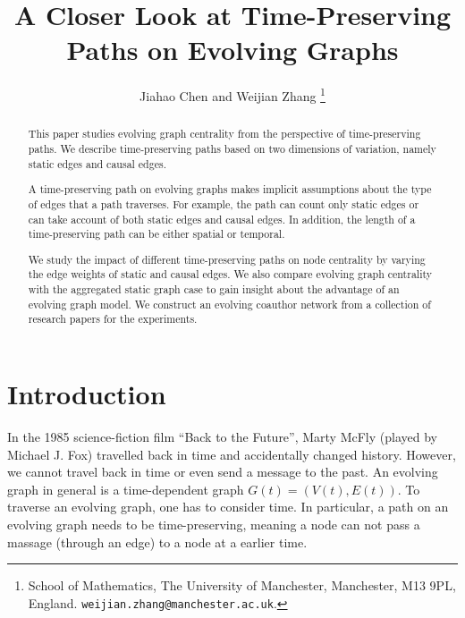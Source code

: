 \documentclass[12pt]{article}
\title{A Closer Look at Time-Preserving Paths on Evolving Graphs}
\author{Jiahao Chen and
Weijian Zhang
\thanks{%
  School of Mathematics,
The University of Manchester,
                Manchester, M13 9PL, England.
\texttt{weijian.zhang@manchester.ac.uk}.
}
}
\theoremstyle{definition}
\begin{document}


\maketitle

\begin{abstract}
This paper studies evolving graph centrality from the perspective of time-preserving paths. We describe time-preserving paths based on two dimensions of variation, namely static edges and causal edges.

A time-preserving path on evolving graphs makes implicit assumptions about the type of edges that a path traverses. For example, the path can count only static edges or can take account of both static edges and causal edges. In addition, the length of a time-preserving path can be either spatial or temporal.

We study the impact of different time-preserving paths on node centrality by varying the edge weights of static and causal edges.
We also compare evolving graph centrality with the aggregated static graph case to gain insight about the advantage of an evolving graph model.
We construct an evolving coauthor network from a collection of research papers for the experiments.
\end{abstract}

\section{Introduction}
\label{sec:introduction}

In the 1985 science-fiction film ``Back to the Future'', Marty McFly (played by Michael J. Fox) travelled back in time and accidentally changed history.
However, we cannot travel back in time or even send a message to the past.
An evolving graph in general is a time-dependent graph $G(t) = (V(t), E(t))$.
To traverse an evolving graph, one has to consider time. In particular, a path on an evolving graph needs to be time-preserving, meaning a node can not pass a massage (through an edge) to a node at a earlier time.
\end{document}
